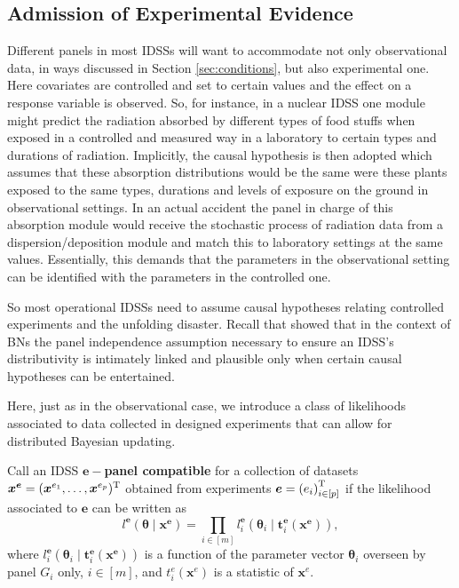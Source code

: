 \subsection{Admission of Experimental Evidence}
Different panels in most IDSSs will want to accommodate not only observational data, in ways discussed in Section \ref{sec:conditions}, but also experimental one. Here covariates are controlled and set to certain values and the effect on a response variable is observed. So, for instance, in a nuclear IDSS one module might predict the radiation absorbed by different types of food stuffs when exposed in a controlled and measured way in a laboratory to certain types and durations of radiation. Implicitly, the causal hypothesis is then adopted which assumes that these absorption distributions would be the same were these plants exposed to the same types, durations and levels of exposure on the ground in observational settings. In an actual accident the panel in charge of this absorption module would receive the stochastic process of radiation data from a dispersion/deposition module and match this to laboratory settings at the same values. Essentially, this demands that the parameters in the observational setting can be identified with the parameters in the controlled one.

So most operational IDSSs need to assume causal hypotheses relating controlled experiments and the unfolding disaster. Recall that \citet{Daneshkhah2004} showed that in the context of BNs the panel independence assumption necessary to ensure an IDSS's distributivity is intimately linked and plausible only when certain causal hypotheses can be entertained.

Here, just as in the observational case, we introduce a class of likelihoods associated to data collected in designed experiments that can allow for distributed Bayesian updating.

\begin{definition}
Call an IDSS $\bm{e}-$\textbf{panel compatible} for a collection of datasets $\bm{x}^{\bm{e}}=(\bm{x}^{e_1},\dots,\bm{x}^{e_p})^{\textnormal{T}}$ obtained from experiments $\bm{e}=\left( e_{i}\right)_{i\in[p]}^{\textnormal{T}} $  if the likelihood associated to $\bm{e}$ can be written as 
\begin{equation*}
l^{\bm{e}}(\bm{\theta }\;|\;\bm{x}^{\bm{e}})=\prod_{i\in[m]}l_{i}^{\bm{e}}(\bm{\theta }_{i}\;|\;\bm{t}_{i}^{\bm{e}}(\bm{x}^{\bm{e}})),
\end{equation*}%
where $l_{i}^{\bm{e}}(\bm{\theta }_{i}\;|\;\bm{t}_{i}^{\bm{e}}(\bm{x}^{\bm{e}}))$ is a function  of the parameter vector $\bm{\theta }_{i}$ overseen by  panel $G_{i}$ only, $i\in[m]$, and $t_i^e(\bm{x}^e)$ is a statistic of $\bm{x}^e$.
\end{definition}

